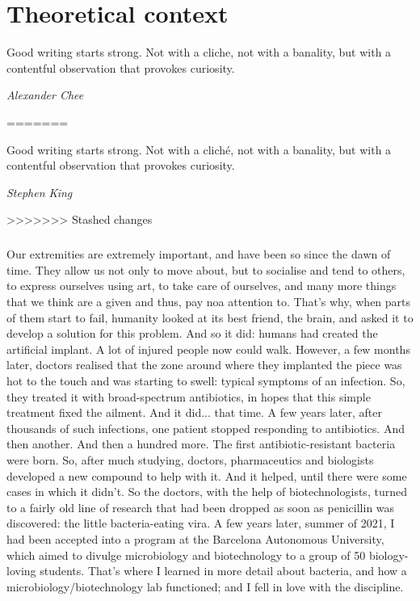 \chapter{Theoretical context}
\epigraph{Good writing starts strong. Not with a cliche, not with a banality, but with a contentful observation that provokes curiosity.}{\textit{Alexander Chee}}
=======
\epigraph{Good writing starts strong. Not with a cliché, not with a banality, but with a contentful observation that provokes curiosity.}{\textit{Stephen King}}
>>>>>>> Stashed changes
\paragraph{}Our extremities are extremely important, and have been so since the dawn of time. They allow us not only to move about, but to socialise and tend to others, to express ourselves using art, to take care of ourselves, and many more things that we think are a given and thus, pay noa attention to. That's why, when parts  of them start to fail, humanity looked at its best friend, the brain, and asked it to develop a solution for this problem. And so it did: humans had created the artificial implant. A lot of injured people now could walk. However, a few months later, doctors realised that the zone around where they implanted the piece was hot to the touch and was starting to swell: typical symptoms of an infection. So, they treated it with broad-spectrum antibiotics, in hopes that this simple treatment fixed the ailment. And it did... that time. A few years later, after thousands of such infections, one patient stopped responding to antibiotics. And then another. And then a hundred more. The first antibiotic-resistant bacteria were born. So, after much studying, doctors, pharmaceutics and biologists developed a new compound to help with it. And it helped, until there were some cases in which it didn't. So the doctors, with the help of biotechnologists, turned to a fairly old line of research that had been dropped as soon as penicillin was discovered: the little bacteria-eating vira.\newline
A few years later, summer of 2021, I had been accepted into a program at the Barcelona Autonomous University, which aimed to divulge microbiology and biotechnology to a group of 50 biology-loving students. That's where I learned in more detail about bacteria, and how a microbiology/biotechnology lab functioned; and I fell in love with the discipline. 

